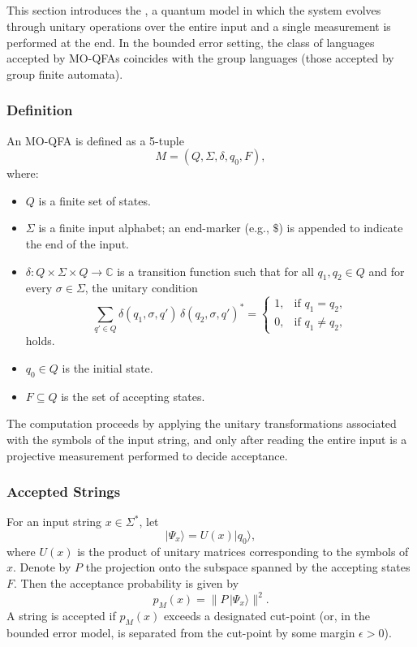 \subsection{}
\label{sec:moqfa}
This section introduces the , a quantum model in which the system evolves through unitary operations over the entire input and a single measurement is performed at the end. In the bounded error setting, the class of languages accepted by MO-QFAs coincides with the group languages (those accepted by group finite automata).

\subsubsection{Definition}
An MO-QFA is defined as a 5-tuple 
\[
M = (Q, \Sigma, \delta, q_0, F),
\]
where:
\begin{itemize}
  \item $Q$ is a finite set of states.
  \item $\Sigma$ is a finite input alphabet; an end-marker (e.g., $\$$) is appended to indicate the end of the input.
  \item $\delta: Q \times \Sigma \times Q \to \mathbb{C}$ is a transition function such that for all $q_1,q_2 \in Q$ and for every $\sigma \in \Sigma$, the unitary condition
  \[
  \sum_{q' \in Q} \delta(q_1, \sigma, q')\,\delta(q_2, \sigma, q')^* =
  \begin{cases}
    1, & \text{if } q_1 = q_2,\\[1mm]
    0, & \text{if } q_1 \neq q_2,
  \end{cases}
  \]
  holds.
  \item $q_0\in Q$ is the initial state.
  \item $F\subseteq Q$ is the set of accepting states.
\end{itemize}
The computation proceeds by applying the unitary transformations associated with the symbols of the input string, and only after reading the entire input is a projective measurement performed to decide acceptance.

\subsubsection{Accepted Strings}
For an input string $x\in\Sigma^*$, let
\[
|\Psi_x\rangle = U(x)|q_0\rangle,
\]
where $U(x)$ is the product of unitary matrices corresponding to the symbols of $x$. Denote by $P$ the projection onto the subspace spanned by the accepting states $F$. Then the acceptance probability is given by
\[
p_M(x) = \|P\,|\Psi_x\rangle\|^2.
\]
A string is accepted if $p_M(x)$ exceeds a designated cut-point (or, in the bounded error model, is separated from the cut-point by some margin $\epsilon>0$).

